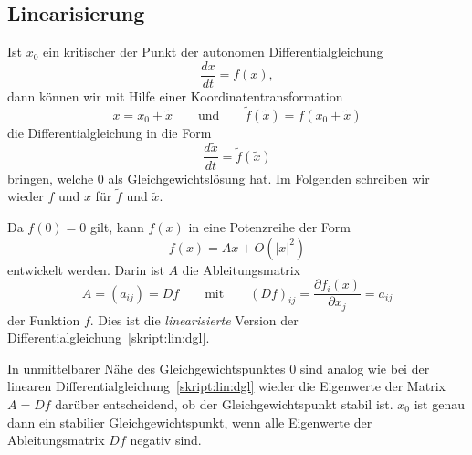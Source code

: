 \subsection{Linearisierung\label{subsection:linearisierung}}
Ist $x_0$ ein kritischer der Punkt der autonomen Differentialgleichung
\[
\frac{dx}{dt} = f(x),
\]
dann können wir mit Hilfe einer Koordinatentransformation
\[
x = x_0 + \tilde x
\qquad
\text{und}
\qquad
\tilde f(\tilde x) = f(x_0 + \tilde x)
\]
die Differentialgleichung in die Form
\[
\frac{d\tilde x}{dt}
=
\tilde f(\tilde x)
\]
bringen, welche $0$ als Gleichgewichtslösung hat.
Im Folgenden schreiben wir wieder $f$ und $x$ für $\tilde f$ und $\tilde x$.

Da $f(0)=0$ gilt, kann $f(x)$ in eine Potenzreihe der Form
\[
f(x) = Ax + O(|x|^2)
\]
entwickelt werden.
Darin ist $A$ die Ableitungsmatrix
\[
A=(a_{ij})=Df
\qquad\text{mit}\qquad
(Df)_{ij}
=
\frac{\partial f_i(x)}{\partial x_j} = a_{ij}
\]
der Funktion $f$.
Dies ist die {\em linearisierte} Version der
Differentialgleichung~\eqref{skript:lin:dgl}.

In unmittelbarer Nähe des Gleichgewichtspunktes $0$ sind analog wie
bei der linearen Differentialgleichung~\eqref{skript:lin:dgl}
wieder die Eigenwerte der Matrix $A=Df$ darüber entscheidend, ob der
Gleichgewichtspunkt stabil ist.
$x_0$ ist genau dann ein stabilier Gleichgewichtspunkt, wenn alle
Eigenwerte der Ableitungsmatrix $Df$ negativ sind.








